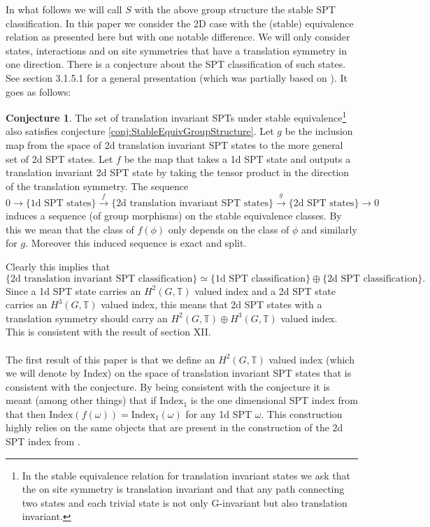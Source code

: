 \documentclass[12pt,a4paper,twoside]{article}
\newcommand{\TT}{\mathbb T}
\theoremstyle{definition}
\newtheorem{conjecture}[theorem]{Conjecture}
\numberwithin{equation}{section}
\begin{document}
In what follows we will call $S$ with the above group structure the stable SPT classification. In this paper we consider the 2D case with the (stable) equivalence relation as presented here but with one notable difference. We will only consider states, interactions and on site symmetries that have a translation symmetry in one direction. There is a conjecture about the SPT classification of such states. See \cite{xiong2019classification} section 3.1.5.1 for a general presentation (which was partially based on \cite{Chen_2013}). It goes as follows:
\begin{conjecture}\label{conj}
	The set of translation invariant SPTs under stable equivalence\footnote{In the stable equivalence relation for translation invariant states we ask that the on site symmetry is translation invariant and that any path connecting two states and each trivial state is not only G-invariant but also translation invariant.} also satisfies conjecture \ref{conj:StableEquivGroupStructure}. Let $g$ be the inclusion map from the space of 2d translation invariant SPT states to the more general set of 2d SPT states. Let $f$ be the map that takes a 1d SPT state and outputs a translation invariant 2d SPT state by taking the tensor product in the direction of the translation symmetry. The sequence
	\begin{equation}
		0\rightarrow\{\text{1d SPT states}\}\stackrel{f}{\rightarrow}\{\text{2d translation invariant SPT states}\}\stackrel{g}{\rightarrow}\{\text{2d SPT states}\}\rightarrow 0
	\end{equation}
	induces a sequence (of group morphisms) on the stable equivalence classes. By this we mean that the class of $f(\phi)$ only depends on the class of $\phi$ and similarly for $g$. Moreover this induced sequence is exact and split.
\end{conjecture}
Clearly this implies that
\begin{equation}
	\{\text{2d translation invariant SPT classification}\}\simeq \{\text{1d SPT classification}\}\oplus \{\text{2d SPT classification}\}.
\end{equation}
Since a 1d SPT state carries an $H^2(G,\TT)$ valued index and a 2d SPT state carries an $H^3(G,\TT)$ valued index, this means that 2d SPT states with a translation symmetry should carry an $H^2(G,\TT)\oplus H^3(G,\TT)$ valued index. This is consistent with the result of \cite{Chen_2013} section XII.
\\\\
The first result of this paper is that we define an $H^2(G,\TT)$ valued index (which we will denote by $\textrm{Index}$) on the space of translation invariant SPT states that is consistent with the conjecture. By being consistent with the conjecture it is meant (among other things) that if $\textrm{Index}_1$ is the one dimensional SPT index from \cite{ogata2019classification} that then $\textrm{Index}(f(\omega))=\textrm{Index}_1(\omega)$ for any 1d SPT $\omega$. This construction highly relies on the same objects that are present in the construction of the 2d SPT index from \cite{ogata2021h3gmathbb}.
\end{document}
